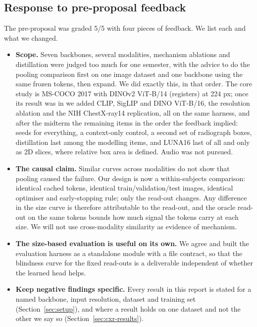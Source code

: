 \documentclass[10pt,letterpaper,twocolumn]{article}
\begin{document}
\subsection{Response to pre-proposal feedback}
\label{sec:feedback}
The pre-proposal was graded 5/5 with four pieces of feedback. We list each and what we changed.

\begin{itemize}
\item \textbf{Scope.} Seven backbones, several modalities, mechanism ablations and distillation
  were judged too much for one semester, with the advice to do the pooling comparison first on
  one image dataset and one backbone using the same frozen tokens, then expand. We did exactly
  this, in that order. The core study is MS-COCO 2017 with DINOv2 ViT-B/14 (registers) at
  224 px; once its result was in we added CLIP, SigLIP and DINO ViT-B/16, the resolution
  ablation and the NIH ChestX-ray14 replication, all on the same harness, and after the
  midterm the remaining items in the order the feedback implied: seeds for everything, a
  context-only control, a second set of radiograph boxes, distillation last among the
  modelling items, and LUNA16 last of all and only as 2D slices, where relative box area is
  defined. Audio was not pursued.
\item \textbf{The causal claim.} Similar curves across modalities do not show that pooling
  caused the failure. Our design is now a within-subjects comparison: identical cached tokens,
  identical train/validation/test images, identical optimiser and early-stopping rule; only the
  read-out changes. Any difference in the size curve is therefore attributable to the read-out,
  and the oracle read-out on the same tokens bounds how much signal the tokens carry at each
  size. We will not use cross-modality similarity as evidence of mechanism.
\item \textbf{The size-based evaluation is useful on its own.} We agree and built the
  evaluation harness as a standalone module with a file contract, so that the blindness curve
  for the fixed read-outs is a deliverable independent of whether the learned head helps.
\item \textbf{Keep negative findings specific.} Every result in this report is stated for a
  named backbone, input resolution, dataset and training set (Section~\ref{sec:setup}), and
  where a result holds on one dataset and not the other we say so
  (Section~\ref{sec:cxr-results}).
\end{itemize}
\end{document}
